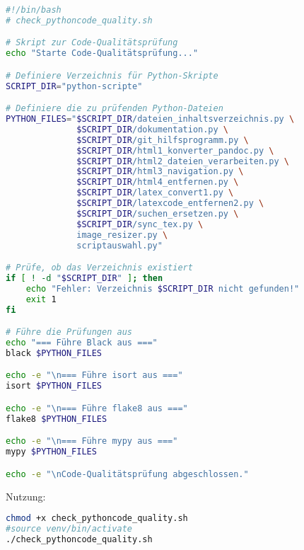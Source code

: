\documentclass{vorlage-design-main}
\begin{document}
\begin{lstlisting}[language=bash]
#!/bin/bash
# check_pythoncode_quality.sh

# Skript zur Code-Qualitätsprüfung
echo "Starte Code-Qualitätsprüfung..."

# Definiere Verzeichnis für Python-Skripte
SCRIPT_DIR="python-scripte"

# Definiere die zu prüfenden Python-Dateien
PYTHON_FILES="$SCRIPT_DIR/dateien_inhaltsverzeichnis.py \
              $SCRIPT_DIR/dokumentation.py \
              $SCRIPT_DIR/git_hilfsprogramm.py \
              $SCRIPT_DIR/html1_konverter_pandoc.py \
              $SCRIPT_DIR/html2_dateien_verarbeiten.py \
              $SCRIPT_DIR/html3_navigation.py \
              $SCRIPT_DIR/html4_entfernen.py \
              $SCRIPT_DIR/latex_convert1.py \
              $SCRIPT_DIR/latexcode_entfernen2.py \
              $SCRIPT_DIR/suchen_ersetzen.py \
              $SCRIPT_DIR/sync_tex.py \
              image_resizer.py \
              scriptauswahl.py"

# Prüfe, ob das Verzeichnis existiert
if [ ! -d "$SCRIPT_DIR" ]; then
    echo "Fehler: Verzeichnis $SCRIPT_DIR nicht gefunden!"
    exit 1
fi

# Führe die Prüfungen aus
echo "=== Führe Black aus ==="
black $PYTHON_FILES

echo -e "\n=== Führe isort aus ==="
isort $PYTHON_FILES

echo -e "\n=== Führe flake8 aus ==="
flake8 $PYTHON_FILES

echo -e "\n=== Führe mypy aus ==="
mypy $PYTHON_FILES

echo -e "\nCode-Qualitätsprüfung abgeschlossen."
\end{lstlisting}

Nutzung:

\begin{lstlisting}[language=bash]
chmod +x check_pythoncode_quality.sh
#source venv/bin/activate
./check_pythoncode_quality.sh
\end{lstlisting}



\clearpage
\printbibliography
\end{document}
